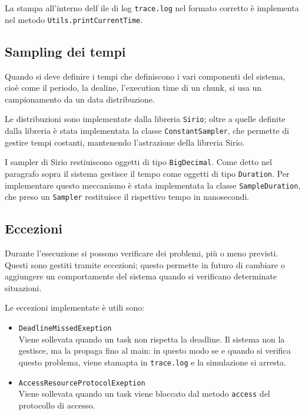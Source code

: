 La stampa all'interno delf ile di log \texttt{trace.log} nel formato corretto è implementa nel metodo \texttt{Utils.printCurrentTime}.

\subsection{Sampling dei tempi}
Quando si deve definire i tempi che definiscono i vari componenti del sistema, cioè come il periodo, la dealine, l'execution time di un chunk, si usa un campionamento da un data distribuzione.

Le distribuzioni sono implementate dalla libreria \texttt{Sirio}; oltre a quelle definite dalla libreria è stata implementata la classe \texttt{ConstantSampler}, che permette di gestire tempi costanti, mantenendo l'astrazione della libreria Sirio.

\myskip

I sampler di Sirio restiuiscono oggetti di tipo \texttt{BigDecimal}. Come detto nel paragrafo sopra il sistema gestisce il tempo come oggetti di tipo \texttt{Duration}. Per implementare questo meccanismo è stata implementata la classe \texttt{SampleDuration}, che preso un \texttt{Sampler} restituisce il rispettivo tempo in nanosecondi.

\subsection{Eccezioni}
Durante l'esecuzione si possono verificare dei problemi, più o meno previsti. Questi sono gestiti tramite eccezioni; questo permette in futuro di cambiare o aggiungere un comportamente del sistema quando si verificano determinate situazioni.

\myskip

Le eccezioni implementate è utili sono:
\begin{itemize}
    \item \texttt{DeadlineMissedExeption} \\
        Viene sollevata quando un task non rispetta la deadline. Il sistema non la gestisce, ma la propaga fino al main: in questo modo se e quando si verifica questo problema, viene stamapta in \texttt{trace.log} e la simulazione si arresta.
    \item \texttt{AccessResourceProtocolExeption} \\
        Viene sollevata quando un task viene bloccato dal metodo \texttt{access} del protocollo di accesso.
\end{itemize}